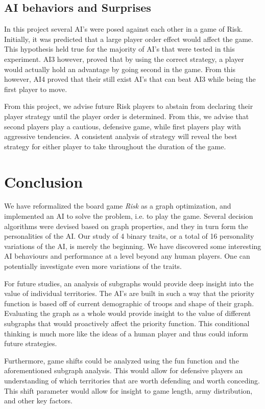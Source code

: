\documentclass[12pt]{article}  %
\begin{document}
\subsection{AI behaviors and Surprises}
In this project several AI’s were posed against each other in a game of Risk. Initially, it was predicted that a large player order effect would affect the game. This hypothesis held true for the majority of AI’s that were tested in this experiment. AI3 however, proved that by using the correct strategy, a player would actually hold an advantage by going second in the game. From this however, AI4 proved that their still exist AI’s that can beat AI3 while being the first player to move. 

From this project, we advise future Risk players to abstain from declaring their player strategy until the player order is determined. From this, we advise that second players play a cautious, defensive game, while first players play with aggressive tendencies. A consistent analysis of strategy will reveal the best strategy for either player to take throughout the duration of the game. 



\section{Conclusion}
We have reformalized the board game \emph{Risk} as a graph optimization, and implemented an AI to solve the problem, i.e. to play the game. Several decision algorithms were devised based on graph properties, and they in turn form the personalities of the AI. Our study of 4 binary traits, or a total of 16 personality variations of the AI, is merely the beginning. We have discovered some interesting AI behaviours and performance at a level beyond any human players. One can potentially investigate even more variations of the traits.

For future studies, an analysis of subgraphs would provide deep insight into the value of individual territories. The AI’s are built in such a way that the priority function is based off of current demographic of troops and shape of their graph. Evaluating the graph as a whole would provide insight to the value of different subgraphs that would proactively affect the priority function. This conditional thinking is much more like the ideas of a human player and thus could inform future strategies. 

Furthermore, game shifts could be analyzed using the fun function and the aforementioned subgraph analysis. This would allow for defensive players an understanding of which territories that are worth defending and worth conceding. This shift parameter would allow for insight to game length, army distribution, and other key factors.  
\end{document}

